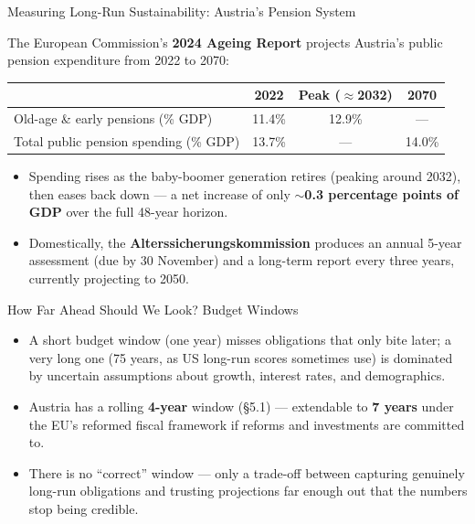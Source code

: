 \documentclass[11pt,aspectratio=169]{beamer}
\begin{document}
\begin{frame}{Measuring Long-Run Sustainability: Austria's Pension System}

  The European Commission's \textbf{2024 Ageing Report} projects Austria's public pension expenditure from 2022 to 2070:
  \begin{center}
  \begin{tabular}{@{}lccc@{}}
    \toprule
     & \textbf{2022} & \textbf{Peak (\(\approx\)2032)} & \textbf{2070} \\
    \midrule
    Old-age \& early pensions (\% GDP) & 11.4\% & 12.9\% & --- \\
    Total public pension spending (\% GDP) & 13.7\% & --- & 14.0\% \\
    \bottomrule
  \end{tabular}
  \end{center}
  \vspace{0.3em}
  \begin{itemize}
    \item Spending rises as the baby-boomer generation retires (peaking around 2032), then eases back down --- a net increase of only \textbf{$\sim$0.3 percentage points of GDP} over the full 48-year horizon.
    \item Domestically, the \textbf{Alterssicherungskommission} produces an annual 5-year assessment (due by 30 November) and a long-term report every three years, currently projecting to 2050.
  \end{itemize}

\end{frame}


\begin{frame}{How Far Ahead Should We Look? Budget Windows}
  \small
  \begin{itemize}
    \item A short budget window (one year) misses obligations that only bite later; a very long one (75 years, as US long-run scores sometimes use) is dominated by uncertain assumptions about growth, interest rates, and demographics.
    \item Austria has a rolling \textbf{4-year} window (\S5.1) --- extendable to \textbf{7 years} under the EU's reformed fiscal framework if reforms and investments are committed to.
    \item   There is no ``correct'' window --- only a trade-off between capturing genuinely long-run obligations and trusting projections far enough out that the numbers stop being credible.
  \end{itemize}
 

  
\end{frame}
\end{document}
